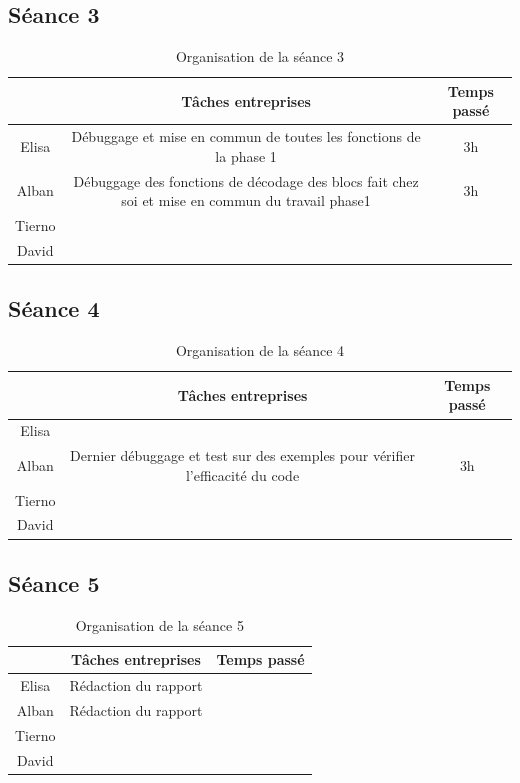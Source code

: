 \documentclass{rapport}
\begin{document}
\subsection{Séance 3}

\begin{table}[H]
	\centering 
	\begin{tabular}{c|c|c}
		& Tâches entreprises& Temps passé\\ \hline
		Elisa& Débuggage et mise en commun de toutes les fonctions de la phase 1 & 3h\\ \hline
		Alban& Débuggage des fonctions de décodage des blocs fait chez soi et mise en commun du travail phase1& 3h\\ \hline
		Tierno& & \\ \hline
		David& & 
	\end{tabular}
	\caption{Organisation de la séance 3}
\end{table}

\subsection{Séance 4}

\begin{table}[H]
	\centering 
	\begin{tabular}{c|c|c}
		& Tâches entreprises& Temps passé\\ \hline
		Elisa& & \\ \hline
		Alban& Dernier débuggage et test sur des exemples pour vérifier l'efficacité du code& 3h\\ \hline
		Tierno& & \\ \hline
		David& & 
	\end{tabular}
	\caption{Organisation de la séance 4}
\end{table}

\subsection{Séance 5} %

\begin{table}[H]
	\centering 
	\begin{tabular}{c|c|c}
		& Tâches entreprises& Temps passé\\ \hline
		Elisa& Rédaction du rapport & \\ \hline
		Alban& Rédaction du rapport & \\ \hline
		Tierno& & \\ \hline
		David& & 
	\end{tabular}
	\caption{Organisation de la séance 5}
\end{table}
\end{document}
